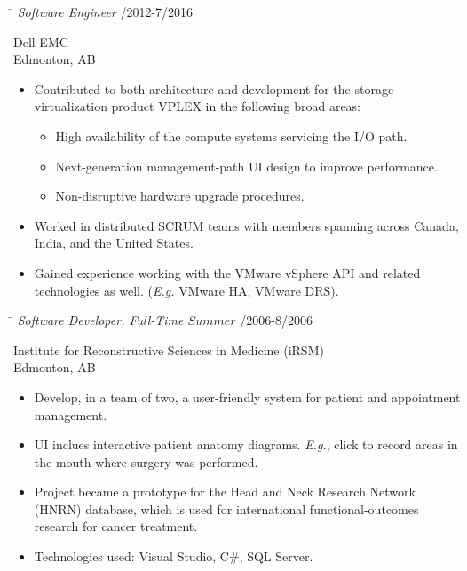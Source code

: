 \documentclass{res}
\begin{document}
\begin{resume}
    \vspace{-0.1in}
    \begin{tabbing}
    \hspace{5.15in}\= \kill  %
    \textit{Software Engineer} /2012-7/2016
    \end{tabbing}\vspace{-22pt}  %
    Dell EMC\\
    Edmonton, AB\\
    \vspace{-2.5ex}\begin{itemize}[noitemsep]
    \item Contributed to both architecture and development for the storage-virtualization product VPLEX in the following broad areas:
    \begin{itemize}[noitemsep]
    \item High availability of the compute systems servicing the I/O path.
    \item Next-generation management-path UI design to improve performance.
    \item Non-disruptive hardware upgrade procedures.
    \end{itemize}
    \item Worked in distributed SCRUM teams with members spanning across Canada, India, and the United States.
    \item Gained experience working with the VMware vSphere API and related technologies as well.  (\textit{E.g.} VMware HA, VMware DRS).
    \end{itemize}

    \vspace{-0.1in}
    \begin{tabbing}
    \hspace{5.15in}\= \kill  %
    \textit{Software Developer, Full-Time \(Summer\)} /2006-8/2006
    \end{tabbing}\vspace{-22pt}  %
    Institute for Reconstructive Sciences in Medicine (iRSM)\\
    Edmonton, AB\\
    \vspace{-2.5ex}\begin{itemize}[noitemsep]
    \item Develop, in a team of two, a user-friendly system for patient and appointment management.
    \item UI inclues interactive patient anatomy diagrams.  \textit{E.g.}, click to record areas in the mouth where surgery was performed.
    \item Project became a prototype for the Head and Neck Research Network (HNRN) database, which is used for international functional-outcomes research for cancer treatment.
    \item Technologies used: Visual Studio, C\#, SQL Server.
    \end{itemize}



\end{resume}
\end{document}
